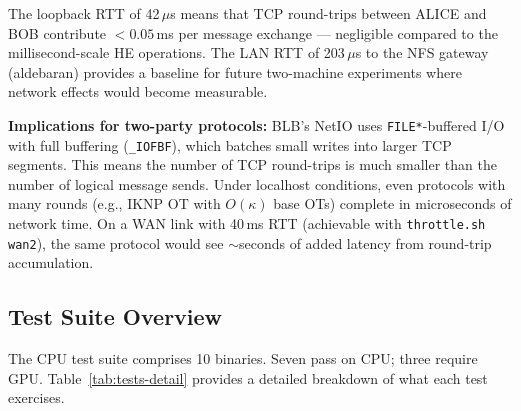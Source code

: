 The loopback RTT of 42\,$\mu$s means that TCP round-trips between ALICE and BOB contribute $<0.05$\,ms per message exchange --- negligible compared to the millisecond-scale HE operations.
The LAN RTT of 203\,$\mu$s to the NFS gateway (aldebaran) provides a baseline for future two-machine experiments where network effects would become measurable.

\textbf{Implications for two-party protocols:} BLB's NetIO uses \texttt{FILE*}-buffered I/O with full buffering (\texttt{\_IOFBF}), which batches small writes into larger TCP segments.
This means the number of TCP round-trips is much smaller than the number of logical message sends.
Under localhost conditions, even protocols with many rounds (e.g., IKNP OT with $O(\kappa)$ base OTs) complete in microseconds of network time.
On a WAN link with 40\,ms RTT (achievable with \texttt{throttle.sh wan2}), the same protocol would see $\sim$seconds of added latency from round-trip accumulation.

\subsection{Test Suite Overview}

The CPU test suite comprises 10 binaries. Seven pass on CPU; three require GPU.
Table~\ref{tab:tests-detail} provides a detailed breakdown of what each test exercises.

